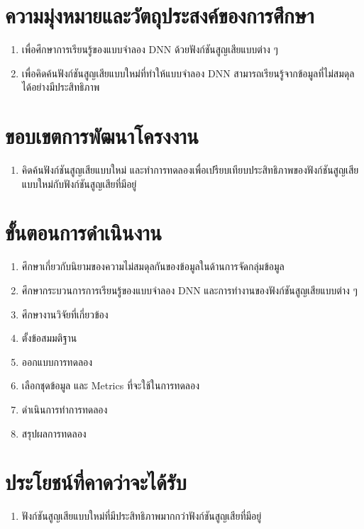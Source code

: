 \section{ความมุ่งหมายและวัตถุประสงค์ของการศึกษา}
\begin{enumerate}
	\item เพื่อศึกษาการเรียนรู้ของแบบจำลอง DNN ด้วยฟังก์ชันสูญเสียแบบต่าง ๆ
	\item เพื่อคิดค้นฟังก์ชันสูญเสียแบบใหม่ที่ทำให้แบบจำลอง DNN สามารถเรียนรู้จากข้อมูลที่ไม่สมดุลได้อย่างมีประสิทธิภาพ
\end{enumerate}
\section{ขอบเขตการพัฒนาโครงงาน}
\begin{enumerate}
	\item คิดค้นฟังก์ชันสูญเสียแบบใหม่ และทำการทดลองเพื่อเปรียบเทียบประสิทธิภาพของฟังก์ชันสูญเสียแบบใหม่กับฟังก์ชันสูญเสียที่มีอยู่
\end{enumerate}
\section{ขั้นตอนการดำเนินงาน}
\begin{enumerate}
	\item ศึกษาเกี่ยวกับนิยามของความไม่สมดุลกันของข้อมูลในด้านการจัดกลุ่มข้อมูล
	\item ศึกษากระบวนการการเรียนรู้ของแบบจำลอง DNN และการทำงานของฟังก์ชันสูญเสียแบบต่าง ๆ
	\item ศึกษางานวิจัยที่เกี่ยวข้อง
	\item ตั้งข้อสมมติฐาน
	\item ออกแบบการทดลอง
	\item เลือกชุดข้อมูล และ Metrics ที่จะใช้ในการทดลอง
	\item ดำเนินการทำการทดลอง
	\item สรุปผลการทดลอง
\end{enumerate}
\section{ประโยชน์ที่คาดว่าจะได้รับ}
\begin{enumerate}
	\item ฟังก์ชันสูญเสียแบบใหม่ที่มีประสิทธิภาพมากกว่าฟังก์ชันสูญเสียที่มีอยู่
\end{enumerate}

